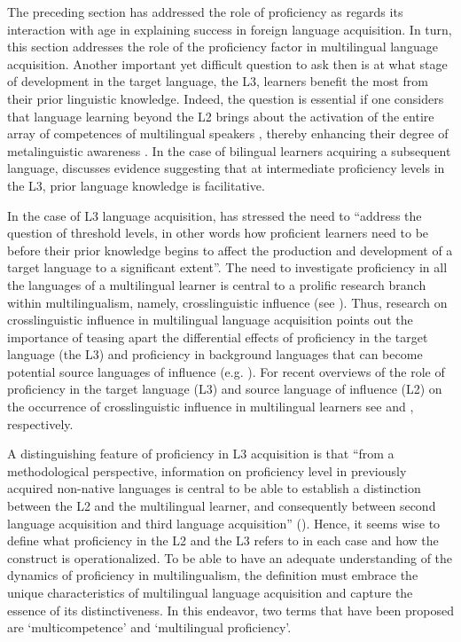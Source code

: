 \documentclass[output=paper,colorlinks,citecolor=brown,nonflat]{../langscibook}
\begin{document}
The preceding section has addressed the role of proficiency as regards its interaction with age in explaining success in foreign language acquisition. In turn, this section addresses the role of the proficiency factor in multilingual language acquisition. Another important yet difficult question to ask then is at what stage of development in the target language, the L3, learners benefit the most from their prior linguistic knowledge. Indeed, the question is essential if one considers that language learning beyond the L2 brings about the activation of the entire array of competences of multilingual speakers \citep{Coste1997}, thereby enhancing their degree of metalinguistic awareness \citep{Jessner2008Knowledge}. In the case of bilingual learners acquiring a subsequent language, \citet{Cenoz2013} discusses evidence suggesting that at intermediate proficiency levels in the L3, prior language knowledge is facilitative.

In the case of L3 language acquisition, \citet[34]{DeAngelis2007} has stressed the need to “address the question of threshold levels, in other words how proficient learners need to be before their prior knowledge begins to affect the production and development of a target language to a significant extent”. The need to investigate proficiency in all the languages of a multilingual learner is central to a prolific research branch within multilingualism, namely, crosslinguistic influence (see ). Thus, research on crosslinguistic influence in multilingual language acquisition points out the importance of teasing apart the differential effects of proficiency in the target language (the L3) and proficiency in background languages that can become potential source languages of influence (e.g. \citealt{BardelLindqvist2007, DeAngelis2007, FalkBardel2010, Jaensch2011, LindqvistBardel2013, SánchezBardel2016}). For recent overviews of the role of proficiency in the target language (L3) and source language of influence (L2) on the occurrence of crosslinguistic influence in multilingual learners see \citet{Sánchez2014} and \citet{SánchezBardel2017}, respectively.

A distinguishing feature of proficiency in L3 acquisition is that “from a methodological perspective, information on proficiency level in previously acquired non-native languages is central to be able to establish a distinction between the L2 and the multilingual learner, and consequently between second language acquisition and third language acquisition” (\citealt[34]{DeAngelis2007}). Hence, it seems wise to define what proficiency in the L2 and the L3 refers to in each case and how the construct is operationalized. To be able to have an adequate understanding of the dynamics of proficiency in multilingualism, the definition must embrace the unique characteristics of multilingual language acquisition and capture the essence of its distinctiveness. In this endeavor, two terms that have been proposed are ‘multicompetence’ \citep{Cook1995} and ‘multilingual proficiency’.
\end{document}
